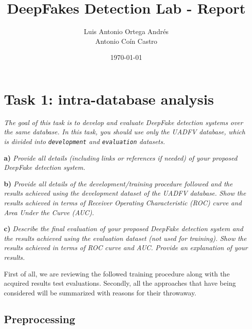 \documentclass[11pt]{article}
\author{Luis Antonio Ortega Andrés\\Antonio Coín Castro}
\date{\today}
\title{DeepFakes Detection Lab - Report}
\begin{document}
\maketitle

\section*{Task 1: intra-database analysis}

\textit{The goal of this task is to develop and evaluate DeepFake detection systems over the same database. In this task, you should use only the UADFV database, which is divided into \texttt{development} and \texttt{evaluation} datasets.}

\textbf{a)} \textit{Provide all details (including links or references if needed) of your proposed DeepFake detection system.}

\textbf{b)} \textit{Provide all details of the development/training procedure followed and the results achieved using the development dataset of the UADFV database. Show the results achieved in terms of Receiver Operating Characteristic (ROC) curve and Area Under the Curve (AUC).}

\textbf{c)} \textit{Describe the final evaluation of your proposed DeepFake detection system and the results achieved using the evaluation dataset (not used for training). Show the results achieved in terms of ROC curve and AUC. Provide an explanation of your results.}

First of all, we are reviewing the followed training procedure along with the acquired results test evaluations. Secondly, all the approaches that have being considered will be summarized with reasons for their throwaway.

\subsection*{Preprocessing}
\end{document}
